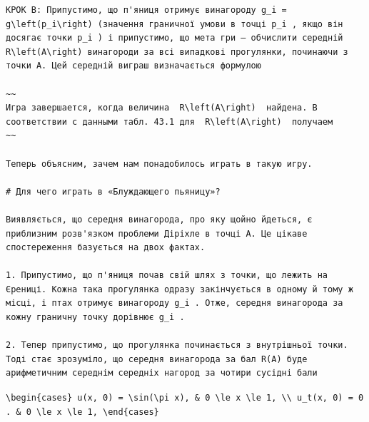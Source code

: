 \documentclass[
  ukrainian,
]{article}
\begin{document}
\begin{verbatim}
КРОК B: Припустимо, що п'яниця отримує винагороду g_i = g\left(p_i\right) (значення граничної умови в точці p_i , якщо він досягає точки p_i ) і припустимо, що мета гри — обчислити середній R\left(A\right) винагороди за всі випадкові прогулянки, починаючи з точки A. Цей середній виграш визначається формулою

~~
Игра завершается, когда величина  R\left(A\right)  найдена. В соответствии с данными табл. 43.1 для  R\left(A\right)  получаем
~~

Теперь объясним, зачем нам понадобилось играть в такую игру.

# Для чего играть в «Блуждающего пьяницу»?

Виявляється, що середня винагорода, про яку щойно йдеться, є приблизним розв'язком проблеми Діріхле в точці A. Це цікаве спостереження базується на двох фактах.

1. Припустимо, що п'яниця почав свій шлях з точки, що лежить на Єрениці. Кожна така прогулянка одразу закінчується в одному й тому ж місці, і птах отримує винагороду g_i . Отже, середня винагорода за кожну граничну точку дорівнює g_i .

2. Тепер припустимо, що прогулянка починається з внутрішньої точки. Тоді стає зрозуміло, що середня винагорода за бал R(A) буде арифметичним середнім середніх нагород за чотири сусідні бали
\end{verbatim}

\texttt{\textbackslash{}begin\{cases\}\ u(x,\ 0)\ =\ \textbackslash{}sin(\textbackslash{}pi\ x),\ \&\ 0\ \textbackslash{}le\ x\ \textbackslash{}le\ 1,\ \textbackslash{}\textbackslash{}\ u\_t(x,\ 0)\ =\ 0.\ \&\ 0\ \textbackslash{}le\ x\ \textbackslash{}le\ 1,\ \textbackslash{}end\{cases\}}
\end{document}
